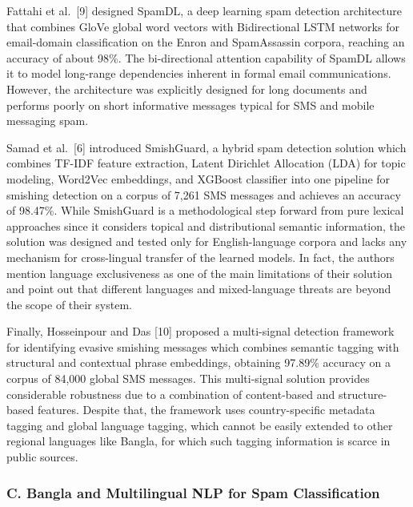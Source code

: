 Fattahi et al.~{[}9{]} designed SpamDL, a deep learning spam detection
architecture that combines GloVe global word vectors with Bidirectional
LSTM networks for email-domain classification on the Enron and
SpamAssassin corpora, reaching an accuracy of about 98\%. The
bi-directional attention capability of SpamDL allows it to model
long-range dependencies inherent in formal email communications.
However, the architecture was explicitly designed for long documents and
performs poorly on short informative messages typical for SMS and mobile
messaging spam.

Samad et al.~{[}6{]} introduced SmishGuard, a hybrid spam detection
solution which combines TF-IDF feature extraction, Latent Dirichlet
Allocation (LDA) for topic modeling, Word2Vec embeddings, and XGBoost
classifier into one pipeline for smishing detection on a corpus of 7,261
SMS messages and achieves an accuracy of 98.47\%. While SmishGuard is a
methodological step forward from pure lexical approaches since it
considers topical and distributional semantic information, the solution
was designed and tested only for English-language corpora and lacks any
mechanism for cross-lingual transfer of the learned models. In fact, the
authors mention language exclusiveness as one of the main limitations of
their solution and point out that different languages and mixed-language
threats are beyond the scope of their system.

Finally, Hosseinpour and Das {[}10{]} proposed a multi-signal detection
framework for identifying evasive smishing messages which combines
semantic tagging with structural and contextual phrase embeddings,
obtaining 97.89\% accuracy on a corpus of 84,000 global SMS messages.
This multi-signal solution provides considerable robustness due to a
combination of content-based and structure-based features. Despite that,
the framework uses country-specific metadata tagging and global language
tagging, which cannot be easily extended to other regional languages
like Bangla, for which such tagging information is scarce in public
sources.

\subsubsection{C. Bangla and Multilingual NLP for Spam
Classification}\label{c.-bangla-and-multilingual-nlp-for-spam-classification}

